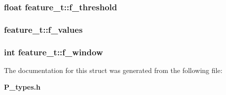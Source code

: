 \subsubsection{\setlength{\rightskip}{0pt plus 5cm}float feature\_\-t::f\_\-threshold}\label{structfeature__t_m6}


\subsubsection{ feature\_\-t::f\_\-values}\label{structfeature__t_m1}


\subsubsection{\setlength{\rightskip}{0pt plus 5cm}int feature\_\-t::f\_\-window}\label{structfeature__t_m5}




The documentation for this struct was generated from the following file:\begin{CompactItemize}
\item 
{\bf P\_\-types.h}\end{CompactItemize}
